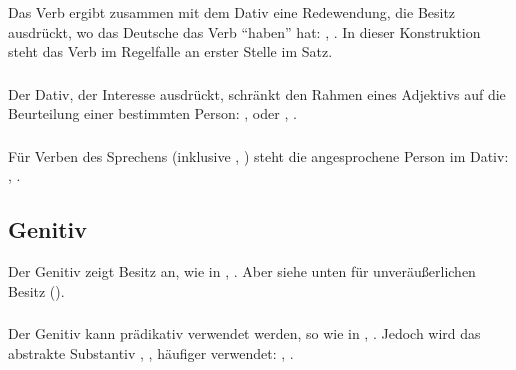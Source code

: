\subsubsection{} Das Verb  ergibt zusammen mit dem Dativ eine Redewendung, die
Besitz ausdr\"uckt, wo das Deutsche das Verb "`haben"' hat: ,
. In dieser Konstruktion steht das Verb im Regelfalle an
erster Stelle im Satz.

\subsubsection{} Der Dativ, der Interesse ausdr\"uckt, schr\"ankt den Rahmen
eines Adjektivs auf die Beurteilung  einer bestimmten
Person: ,  oder
,
.

\subsubsection{} F\"ur Verben des Sprechens (inklusive , ) steht
die angesprochene Person im Dativ: ,
.

\subsection{Genitiv} Der Genitiv zeigt Besitz an, wie in ,
.
Aber siehe unten f\"ur unver\"au\ss{}erlichen Besitz ().

\subsubsection{} Der Genitiv kann pr\"adikativ verwendet werden, so wie in
, . Jedoch wird das abstrakte
Substantiv , , h\"aufiger verwendet:
,
.\label{syn:pum:genitive}

